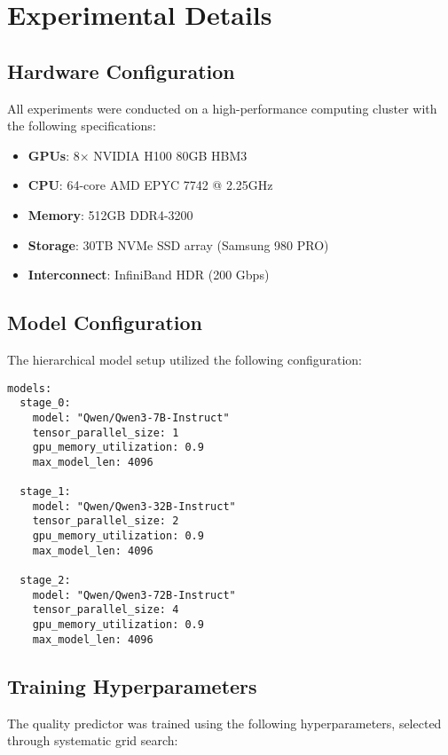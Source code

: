 \documentclass{article}
\theoremstyle{plain}
\theoremstyle{definition}
\theoremstyle{remark}
\begin{document}
\section{Experimental Details}
\label{app:experimental}

\subsection{Hardware Configuration}

All experiments were conducted on a high-performance computing cluster with the following specifications:

\begin{itemize}
\item \textbf{GPUs}: 8× NVIDIA H100 80GB HBM3
\item \textbf{CPU}: 64-core AMD EPYC 7742 @ 2.25GHz
\item \textbf{Memory}: 512GB DDR4-3200
\item \textbf{Storage}: 30TB NVMe SSD array (Samsung 980 PRO)
\item \textbf{Interconnect}: InfiniBand HDR (200 Gbps)
\end{itemize}

\subsection{Model Configuration}

The hierarchical model setup utilized the following configuration:

\begin{verbatim}
models:
  stage_0:
    model: "Qwen/Qwen3-7B-Instruct"
    tensor_parallel_size: 1
    gpu_memory_utilization: 0.9
    max_model_len: 4096
    
  stage_1:
    model: "Qwen/Qwen3-32B-Instruct" 
    tensor_parallel_size: 2
    gpu_memory_utilization: 0.9
    max_model_len: 4096
    
  stage_2:
    model: "Qwen/Qwen3-72B-Instruct"
    tensor_parallel_size: 4
    gpu_memory_utilization: 0.9
    max_model_len: 4096
\end{verbatim}

\subsection{Training Hyperparameters}

The quality predictor was trained using the following hyperparameters, selected through systematic grid search:
\end{document}
